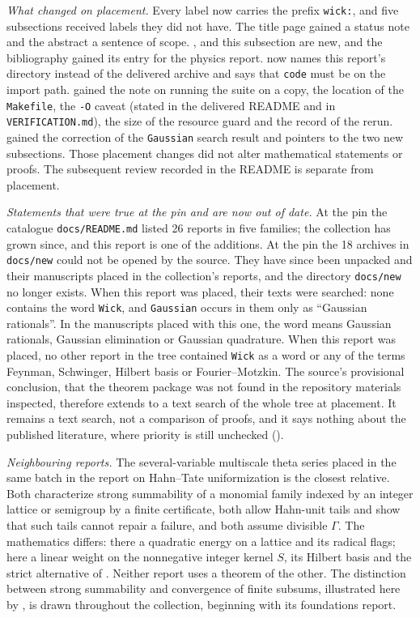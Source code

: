 \documentclass[11pt,letterpaper]{article}
\numberwithin{equation}{section}
\theoremstyle{definition}
\theoremstyle{remark}
\begin{document}
\emph{What changed on placement.} Every label now carries the prefix
\texttt{wick:}, and five subsections received labels they did not have. The
title page gained a status note and the abstract a sentence of scope.
,  and this subsection are
new, and the bibliography gained its entry for the physics report.
 now names this report's directory instead of
the delivered archive and says that \texttt{code} must be on the import
path.  gained the note on running the suite on a copy,
the location of the \texttt{Makefile}, the \texttt{-O} caveat (stated in the
delivered README and in \texttt{VERIFICATION.md}), the size of the resource guard and the record of
the rerun.  gained the correction of the
\texttt{Gaussian} search result and pointers to the two new subsections.
Those placement changes did not alter mathematical statements or proofs.
The subsequent review recorded in the README is separate from placement.

\emph{Statements that were true at the pin and are now out of date.} At the
pin the catalogue \texttt{docs/README.md} listed 26 reports in five
families; the collection has grown since, and this report is one of the
additions. At the pin the 18 archives in \texttt{docs/new} could not be
opened by the source. They have since been unpacked and their manuscripts
placed in the collection's reports, and the directory \texttt{docs/new} no
longer exists. When this report was placed, their texts were searched: none
contains the word \texttt{Wick}, and \texttt{Gaussian} occurs in them only
as ``Gaussian rationals''. In the manuscripts placed with this one, the word
means Gaussian rationals, Gaussian elimination or Gaussian quadrature. When
this report was placed, no other report in the tree contained \texttt{Wick}
as a word or any of the terms Feynman, Schwinger, Hilbert basis or
Fourier--Motzkin. The source's provisional conclusion, that the theorem
package was not found in the repository materials inspected, therefore
extends to a text search of the whole tree at placement. It remains a text search, not a comparison of proofs, and
it says nothing about the published literature, where priority is still
unchecked ().

\emph{Neighbouring reports.} The several-variable multiscale theta series
placed in the same batch in the report on Hahn--Tate uniformization is the
closest relative. Both characterize strong summability of a monomial family
indexed by an integer lattice or semigroup by a finite certificate, both
allow Hahn-unit tails and show that such tails cannot repair a failure, and
both assume divisible $\Gamma$. The mathematics differs: there a quadratic
energy on a lattice and its radical flags; here a linear weight on the
nonnegative integer kernel $S$, its Hilbert basis and the strict alternative
of . Neither report uses a theorem of the other.
The distinction between strong summability and convergence of finite
subsums, illustrated here by , is drawn throughout the
collection, beginning with its foundations report.
\end{document}
